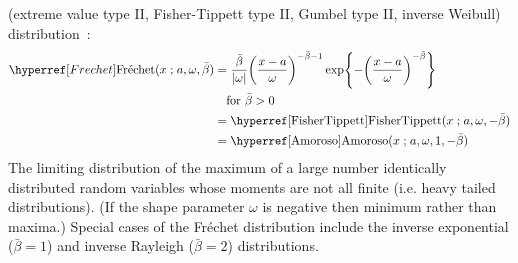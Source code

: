  (extreme value type II, Fisher-Tippett type II, Gumbel type II, inverse Weibull) distribution~\cite{Frechet1927,Gumbel1958}:
\begin{align}
\label{Frechet}
\Frechet(x \given a , \omega, \bar{\beta}) 
&=	\frac{\bar{\beta}}{| \omega |} \Left(\frac{x-a }{\omega}\Right)^{-\bar{\beta}-1} 
\exp\Left\{-\Left(\frac{x-a }{\omega}\Right)^{-\bar{\beta}}\Right\} \checked
\\ \notag &\quad \text{for } \bar{\beta}>0 \checked
\\  \notag
& = \opr{FisherTippett}(x\given  a, \omega, -\bar{\beta}) \checked
\\ \notag 
&= \opr{Amoroso}(x\given  a , \omega,1,-\bar{\beta})\notag \checked
\end{align}
The limiting distribution of the maximum of a large number identically distributed random variables whose moments are not all finite (i.e. heavy tailed distributions).  (If the shape parameter $\omega$ is negative then minimum rather than maxima.)
Special cases of the Fr\'{e}chet  distribution include the inverse exponential ($\bar{\beta}=1$) and inverse Rayleigh ($\bar{\beta}=2$) distributions.
 








